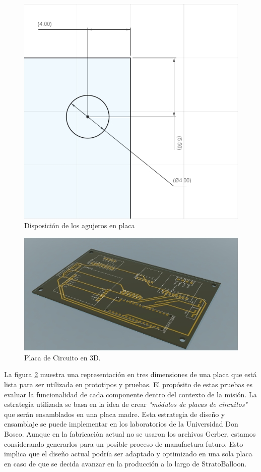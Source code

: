 \begin{figure}[h]
    \centering
    \includegraphics[width=0.75\linewidth]{document/figures/04_disposicion_agujero_PCB.png}
    \caption{Disposición de los agujeros en placa}
    \label{fig:agujeros_placa}
\end{figure}
\newpage
\begin{figure}[h]
    \centering
    \includegraphics[width=1\linewidth]{document/figures/04_PCB v1_3D.png}
    \caption{Placa de Circuito en 3D.}
    \label{fig:PCB_3D}
\end{figure}

La figura \ref{fig:PCB_3D} muestra una representación en tres dimensiones de una placa que está lista para ser utilizada en prototipos y pruebas. El propósito de estas pruebas es evaluar la funcionalidad de cada componente dentro del contexto de la misión. La estrategia utilizada se basa en la idea de crear \textit{"módulos de placas de circuitos"} que serán ensamblados en una placa madre. Esta estrategia de diseño y ensamblaje se puede implementar en los laboratorios de la Universidad Don Bosco. Aunque en la fabricación actual no se usaron los archivos Gerber, estamos considerando generarlos para un posible proceso de manufactura futuro. Esto implica que el diseño actual podría ser adaptado y optimizado en una sola placa en caso de que se decida avanzar en la producción a lo largo de StratoBalloon. 

